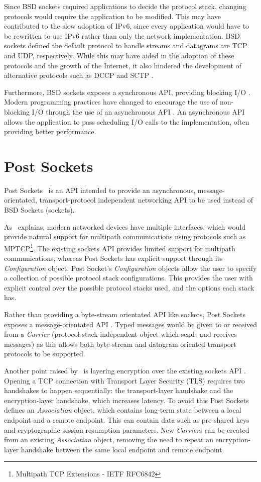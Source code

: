 Since BSD sockets required applications to decide the protocol stack, changing protocols would require the application
to be modified.
This may have contributed to the slow adoption of IPv6, since every application would have to be rewritten to use IPv6
rather than only the network implementation.
BSD sockets defined the default protocol to handle streams and datagrams are TCP and UDP, respectively.
While this may have aided in the adoption of these protocols and the growth of the Internet, it also hindered the
development of alternative protocols such as DCCP and SCTP .

Furthermore, BSD sockets exposes a synchronous API, providing blocking I/O .
Modern programming practices have changed to encourage the use of non-blocking I/O through the use of an asynchronous
API .
An asynchronous API allows the application to pass scheduling I/O calls to the implementation, often providing better
performance.

\section{Post Sockets}\label{sec:post-sockets}
Post Sockets~\citep{kuhlewind_postsocketsabstract_} is an API intended to provide an asynchronous, message-orientated,
transport-protocol independent networking API to be used instead of BSD Sockets (sockets).

As~\cite{kuhlewind_postsocketsabstract_} explains, modern networked devices have multiple interfaces, which would
provide natural support for multipath communications using protocols such as
MPTCP\footnote{Multipath TCP Extensions - IETF RFC6842}.
The existing sockets API provides limited support for multipath communications, whereas Post Sockets has explicit
support through its \emph{Configuration} object.
Post Socket's \emph{Configuration} objects allow the user to specify a collection of possible protocol stack
configurations.
This provides the user with explicit control over the possible protocol stacks used, and the options each stack has.

Rather than providing a byte-stream orientated API like sockets, Post Sockets exposes a message-orientated API .
Typed messages would be given to or received from a \emph{Carrier} (protocol stack-independent object which sends and
receives messages) as this allows both byte-stream and datagram oriented transport protocols to be supported.

Another point raised by~\cite{kuhlewind_postsocketsabstract_} is layering encryption over the existing sockets API .
Opening a TCP connection with Transport Layer Security (TLS) requires two handshakes to happen sequentially: the
transport-layer handshake and the encryption-layer handshake, which increases latency.
To avoid this Post Sockets defines an \emph{Association} object, which contains long-term state between a local endpoint
and a remote endpoint.
This can contain data such as pre-shared keys and cryptographic session resumption parameters.
New \emph{Carrier}s can be created from an existing \emph{Association} object, removing the need to repeat an
encryption-layer handshake between the same local endpoint and remote endpoint.

